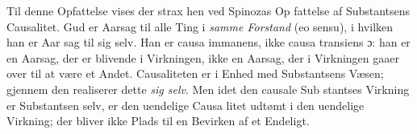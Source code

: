 \documentclass[12pt,a4paper]{book}
\begin{document}
Til denne Opfattelse vises der strax hen ved Spinozas Op\-%
fattelse af Substantsens Causalitet. Gud er Aarsag til alle
Ting i \emph{samme Forstand} (eo sensu), i hvilken han er Aar\-%
sag til sig selv. Han er causa immanens, ikke causa transiens
ɔ: han er en Aarsag, der er blivende i Virkningen, ikke en
Aarsag, der i Virkningen gaaer over til at være et Andet.
Causaliteten er i Enhed med Substantsens Væsen; gjennem
den realiserer dette \emph{sig selv}. Men idet den causale Sub\-%
stantses Virkning er Substantsen selv, er den uendelige Causa\-%
litet udtømt i den uendelige Virkning; der bliver ikke Plads
til en Bevirken af et Endeligt.
\end{document}
